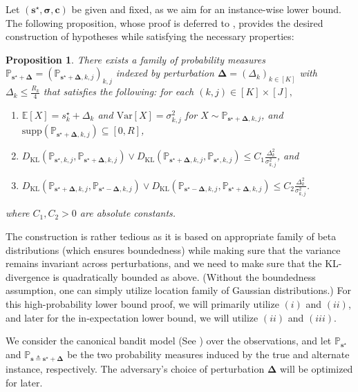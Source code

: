 \documentclass{article}
\def\vc{{\bm{c}}}
\def\vs{{\bm{s}}}
\def\sP{{\mathbb{P}}}
\newcommand{\E}{\mathbb{E}}
\newcommand{\KL}{D_{\mathrm{KL}}}
\newcommand{\Var}{\mathrm{Var}}
\theoremstyle{plain}
\newtheorem{proposition}[theorem]{Proposition}
\theoremstyle{definition}
\theoremstyle{plain}
\begin{document}
Let $(\vs^\star, \bm\sigma, \vc)$ be given and fixed, as we aim for an instance-wise lower bound.
The following proposition, whose proof is deferred to , provides the desired construction of hypotheses while satisfying the necessary properties:
\begin{proposition}
\label{prop:beta-construction}
    There exists a family of probability measures $\sP_{\vs^\star + \bm\Delta} = \left( \sP_{\vs^\star + \bm\Delta, k, j} \right)_{k,j}$ indexed by perturbation $\bm\Delta = (\Delta_k)_{k \in [K]}$ with $\Delta_k \leq \frac{R_k}{4}$ that satisfies the following: for each $(k, j) \in [K] \times [J],$
    \begin{enumerate}
        \item[$(i)$] $\E[X] = s_k^\star + \Delta_k$ and $\Var[X] = \sigma_{k,j}^2$ for $X \sim \sP_{\vs^\star + \bm\Delta, k, j}$, and $\mathrm{supp}(\sP_{\vs^\star + \bm\Delta, k, j}) \subseteq [0, R]$,
        \item[$(ii)$] $\KL\left( \sP_{\vs^\star, k, j}, \sP_{\vs^\star + \bm\Delta, k, j} \right) \vee \KL\left( \sP_{\vs^\star + \bm\Delta, k, j}, \sP_{\vs^\star, k, j} \right) \leq C_1 \frac{\Delta_k^2}{\sigma_{k,j}^2}$, and
        \item[$(iii)$] $\KL\left( \sP_{\vs^\star + \bm\Delta, k, j}, \sP_{\vs^\star - \bm\Delta, k, j} \right) \vee \KL\left( \sP_{\vs^\star - \bm\Delta, k, j}, \sP_{\vs^\star + \bm\Delta, k, j} \right) \leq C_2 \frac{\Delta_k^2}{\sigma_{k,j}^2}$.
    \end{enumerate}
    where $C_1, C_2 > 0$ are absolute constants.
\end{proposition}
The construction is rather tedious as it is based on appropriate family of beta distributions (which ensures boundedness) while making sure that the variance remains invariant across perturbations, and we need to make sure that the KL-divergence is quadratically bounded as above.
(Without the boundedness assumption, one can simply utilize location family of Gaussian distributions.)
For this high-probability lower bound proof, we will primarily utilize $(i)$ and $(ii)$, and later for the in-expectation lower bound, we will utilize $(ii)$ and $(iii)$.

We consider the canonical bandit model (See \citet[Section 4.6]{banditalgorithms}) over the observations, and let $\sP_{\vs^\star}$ and $\sP_{\vs \triangleq \vs^\star + \bm\Delta}$ be the two probability measures induced by the true and alternate instance, respectively.
The adversary's choice of perturbation $\bm\Delta$ will be optimized for later.
\end{document}
